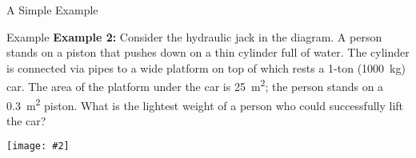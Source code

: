 \documentclass[12pt,aspectratio=169]{beamer}
\newcommand{\pic}[2]{\texttt{[image: \#2]}}
\begin{document}
\begin{frame}{A Simple Example}
\end{frame}



\begin{frame}{Example}
  \textbf{Example 2:} Consider the hydraulic jack in the diagram. A person
  stands on a piston that pushes down on a thin cylinder full of water. The
  cylinder is connected via pipes to a wide platform on top of which rests a
  1-ton (\SI{1000}{\kilo\gram}) car. The area of the platform under the car is
  \SI{25}{\metre\squared}; the person stands on a \SI{.3}{\metre\squared}
  piston. What is the lightest weight of a person who could successfully lift
  the car?
  \begin{center}
    \vspace{-.2in}
    \pic{.35}{jack}
    
  \end{center}
\end{frame}
\end{document}
